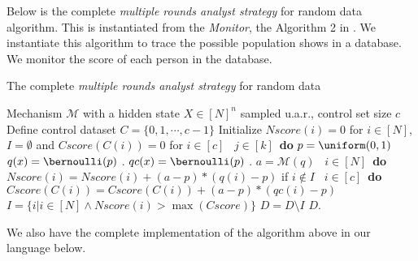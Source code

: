 
    \begin{example}
    Below is the complete \emph{multiple rounds analyst strategy} for random data algorithm. This is instantiated from the
    \emph{Monitor}, the Algorithm 2 in \cite{RogersRSSTW20}.
    We instantiate this algorithm to trace the possible population shows in a database.
    We monitor the score of each person in the database. 
    \begin{algorithm}
    \footnotesize
    \caption{The complete \emph{multiple rounds analyst strategy} for random data}
    \label{alg:multiRound}
    \begin{algorithmic}
    \REQUIRE Mechanism $\mathcal{M}$ with a hidden state $X\in [N]^{n}$ sampled u.a.r., control set size $c$
    \STATE Define control dataset $C = \{0,1, \cdots, c - 1\}$
    \STATE Initialize $Nscore(i) = 0$ for $i \in [N]$, $I = \emptyset$ and $Cscore(C(i)) = 0$ for $i \in [c]$
    \ $j\in [k]$\ {\bf do} 
    \STATE {} $p=\uniform(0,1)$ 
    \STATE {} $q (x) = \bernoulli ( p )$ .
    \STATE {} $qc (x) = \bernoulli ( p )$ .
    \STATE {} $a = \mathcal{M}(q)$ 
    \STATE {}\ $i \in [N]$\ {\bf do}
    \STATE \qquad \qquad $Nscore(i) = Nscore(i) + (a - p)*(q (i) - p)$ if $i \notin I$
    \STATE {}\ $i \in [c]$\ {\bf do}
    \STATE \qquad \qquad $Cscore(C(i)) = Cscore(C(i)) + (a - p)*(qc (i) - p)$
    \STATE {} $I = \{i | i\in [N] \land Nscore(i) > \max(Cscore)\}$
    \STATE {} $D = D \setminus I$ 
    \RETURN $D$.
    \end{algorithmic}
    \end{algorithm}
    We also have the complete implementation of the algorithm above in our language below.
    {\small
    \begin{figure}
        \begin{subfigure}{1.0\textwidth}
\end{subfigure}
\end{figure}}
\end{example}
